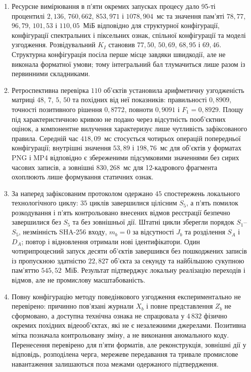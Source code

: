 \begin{enumerate}[label=\arabic*.]
\item Ресурсне вимірювання в п’яти окремих запусках процесу дало 95-ті процентилі $2{,}136$, $760{,}662$, $853{,}971$ і $1078{,}904$~мс та значення пам’яті $78{,}77$, $96{,}79$, $101{,}53$ і $110{,}05$~МіБ відповідно для структурної конфігурації, конфігурації спектральних і піксельних ознак, спільної конфігурації та моделі узгодження. Розвідувальний $K_I$ становив $77{,}50$, $50{,}69$, $68{,}95$ і $69{,}46$. Структурна конфігурація посіла перше місце завдяки швидкодії, але не виконала форматної умови; тому інтегральний бал тлумачиться лише разом із первинними складниками.

\item Ретроспективна перевірка $110$ об’єктів установила арифметичну узгодженість матриці $48$, $7$, $5$, $50$ та похідних від неї показників: правильності $0{,}8909$, точності позитивного рішення $0{,}8772$, повноти $0{,}9091$ і $F_1=0{,}8929$. Площу під характеристичною кривою не подано через відсутність пооб’єктних оцінок, а компонентне вилучення характеризує лише чутливість зафіксованого правила. Середній час $418{,}09$~мс стосується чотирьох операцій попередньої конфігурації; внутрішні значення $53{,}89$ і $198{,}76$~мс для об’єктів у форматах PNG і MP4 відповідно є збереженими підсумковими значеннями без сирих часових записів, а зовнішні $830{,}268$~мс для 12-кадрового фрагмента охоплюють лише формування статичних ознак.

\item За наперед зафіксованим протоколом одержано $45$ спостережень локального технологічного циклу: $35$ циклів завершилися цілісним $S_5$, а п’ять помилок розкодування і п’ять контрольовано внесених відмов реєстрації безпечно завершилися без $S_5$ та без зовнішньої дії. Штатні цикли зберегли порядок $S_1$--$S_5$, незмінність SHA-256 входу, $m_b=0$ за відсутності $J_b$ та розділення $S_A$ і $D_A$; повтор і відновлення отримали нові ідентифікатори. Один чотирипроцесний запуск десяти об’єктів завершився без пошкоджених записів із пропускною здатністю $22{,}827$ об’єкта за секунду та найбільшою сукупною пам’яттю $545{,}52$~МіБ. Результат підтверджує локальну реалізацію переходів і відмов, але не промислову масштабованість.

\item Повну конфігурацію методу поведінкового узгодження експериментально не перевірено: причинно пов’язані журнали $X_b$ і повне представлення $Z_b$ не сформовано, а доступна технічна ознака не спрацювала у $4\,832$ фізично окремих похідних відеооб’єктах, які не є незалежними джерелами. Позитивна мітка позначала контрольовану зміну, а не виконання аномального коду. Перенесення перевірено для п’яти форматів, але реконструкція, зовнішні дії у відповідь, розподілена черга, мережеве передавання та тривале промислове навантаження залишаються поза межами одержаного підтвердження.
\end{enumerate}
